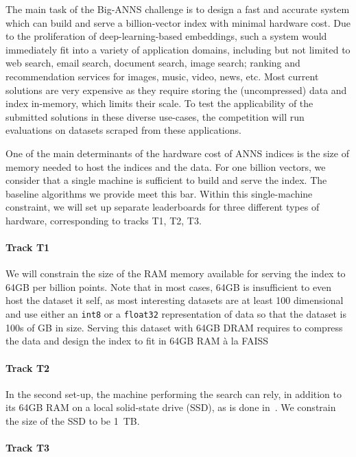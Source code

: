 The main task of the Big-ANNS challenge is to design a fast and
accurate system which can build and serve a billion-vector index with
minimal hardware cost.  Due to the proliferation of
deep-learning-based embeddings, such a system would immediately fit
into a variety of application domains, including but not limited to
web search, email search, document search, image search; ranking and
recommendation services for images, music, video, news, etc. Most
current solutions are very expensive as they require storing the
(uncompressed) data and index in-memory, which limits their scale. To
test the applicability of the submitted solutions in these diverse
use-cases, the competition will run evaluations on datasets scraped
from these applications.


One of the main determinants of the hardware cost of ANNS indices is
the size of memory needed to host the indices and the data.  For one
billion vectors, we consider that a single machine is sufficient to
build and serve the index. The baseline algorithms we provide meet
this bar.  Within this single-machine constraint, we will set up
separate leaderboards for three different types of hardware,
corresponding to tracks T1, T2, T3.

\paragraph{Track T1}

We will constrain the size of the RAM memory available for serving the
index to 64GB per billion points. Note that in most cases, 64GB is
insufficient to even host the dataset it self, as most interesting
datasets are at least 100 dimensional and use either an {\tt int8} or
a {\tt float32} representation of data so that the dataset is 100s of
GB in size.  Serving this dataset with 64GB DRAM requires to compress
the data and design the index to fit in 64GB RAM \`a la
FAISS~\cite{Faiss17}

\paragraph{Track T2}

In the second set-up, the machine performing the search can rely, in addition to its 64GB RAM on a local 
solid-state drive (SSD), as is done in~\cite{DiskANN19}. 
We constrain the size of the SSD to be 1~TB. 


\paragraph{Track T3}

